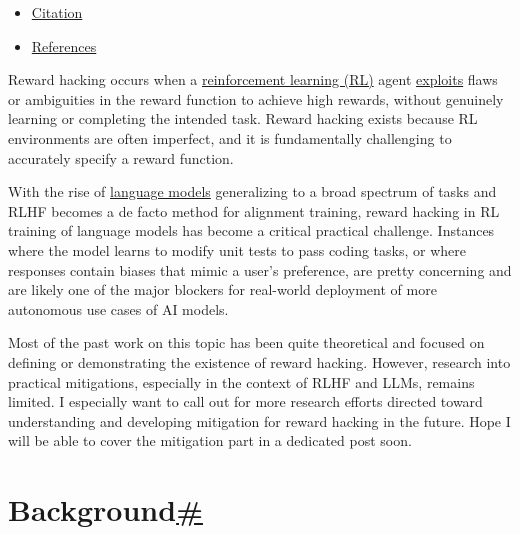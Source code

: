 \begin{itemize}
  \begin{itemize}
  \tightlist
  \item
    \hyperref[rl-algorithm-improvement]{RL Algorithm Improvement}
  \item
    \hyperref[detecting-reward-hacking]{Detecting Reward Hacking}
  \item
    \hyperref[data-analysis-of-rlhf]{Data Analysis of RLHF}
  \end{itemize}
\item
  \hyperref[citation]{Citation}
\item
  \hyperref[references]{References}
\end{itemize}

Reward hacking occurs when a \href{(https://lilianweng.github.io/posts/2018-02-19-rl-overview/)}{reinforcement learning (RL)} agent \href{https://lilianweng.github.io/posts/2018-01-23-multi-armed-bandit/\#exploitation-vs-exploration}{exploits} flaws or ambiguities in the reward function to achieve high rewards, without genuinely learning or completing the intended task. Reward hacking exists because RL environments are often imperfect, and it is fundamentally challenging to accurately specify a reward function.

With the rise of \href{https://lilianweng.github.io/posts/2019-01-31-lm/}{language models} generalizing to a broad spectrum of tasks and RLHF becomes a de facto method for alignment training, reward hacking in RL training of language models has become a critical practical challenge. Instances where the model learns to modify unit tests to pass coding tasks, or where responses contain biases that mimic a user's preference, are pretty concerning and are likely one of the major blockers for real-world deployment of more autonomous use cases of AI models.

Most of the past work on this topic has been quite theoretical and focused on defining or demonstrating the existence of reward hacking. However, research into practical mitigations, especially in the context of RLHF and LLMs, remains limited. I especially want to call out for more research efforts directed toward understanding and developing mitigation for reward hacking in the future. Hope I will be able to cover the mitigation part in a dedicated post soon.

\section{\texorpdfstring{Background\hyperref[background]{\#}}{Background\#}}\label{background}


